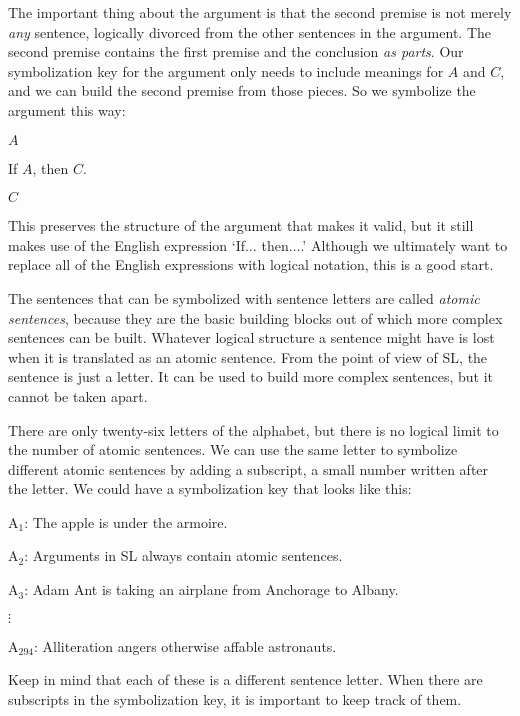 The important thing about the argument is that the second premise is not merely \emph{any} sentence, logically divorced from the other sentences in the argument. The second premise contains the first premise and the conclusion \emph{as parts}. Our symbolization key for the argument only needs to include meanings for $A$ and $C$, and we can build the second premise from those pieces. So we symbolize the argument this way:
\begin{earg}
\item[] $A$
\item[] If $A$, then $C$.
\item[\therefore] $C$
\end{earg}
This preserves the structure of the argument that makes it valid, but it still makes use of the English expression `If$\ldots$ then$\ldots$.' Although we ultimately want to replace all of the English expressions with logical notation, this is a good start.

The sentences that can be symbolized with sentence letters are called \emph{atomic sentences}, because they are the basic building blocks out of which more complex sentences can be built. Whatever logical structure a sentence might have is lost when it is translated as an atomic sentence. From the point of view of SL, the sentence is just a letter. It can be used to build more complex sentences, but it cannot be taken apart.



There are only twenty-six letters of the alphabet, but there is no logical limit to the number of atomic sentences. We can use the same letter to symbolize different atomic sentences by adding a subscript, a small number written after the letter. We could have a symbolization key that looks like this:
\begin{ekey}
\item[A$_1$:] The apple is under the armoire.
\item[A$_2$:] Arguments in SL always contain atomic sentences.
\item[A$_3$:] Adam Ant is taking an airplane from Anchorage to Albany.
\item[$\vdots$]
\item[A$_{294}$:] Alliteration angers otherwise affable astronauts.
\end{ekey}
Keep in mind that each of these is a different sentence letter. When there are subscripts in the symbolization key, it is important to keep track of them.

